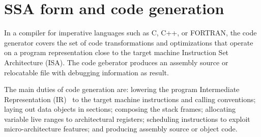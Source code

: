\chapter{SSA form and code generation }
\label{chapter:ssa-codegen}

In a compiler for imperative languages such as C, C++, or FORTRAN, the code
generator covers the set of code transformations and optimizations that operate
on a program representation close to the target machine Instruction Set
Architecture (ISA). The code geberator produces an
assembly source or relocatable file with debugging information as result.

The main duties of code generation are: lowering the program Intermediate
Representation (IR)~\cite{Stanier:2013:CS} to the target machine instructions and calling conventions;
laying out data objects in sections; composing the stack frames; allocating
variable live ranges to architectural registers; scheduling instructions to
exploit micro-architecture features; and producing assembly source or object code.

